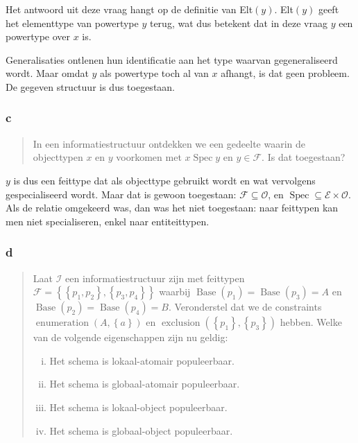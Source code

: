 \documentclass[10pt]{article}
\newcommand{\Spec}{\ensuremath{\operatorname{Spec}}}
\newcommand{\Base}{\ensuremath{\operatorname{Base}}}
\newcommand{\I}{\ensuremath{\mathcal{I}}}
\newcommand{\F}{\ensuremath{\mathcal{F}}}
\begin{document}
Het antwoord uit deze vraag hangt op de definitie van Elt$(y)$. Elt$(y)$ geeft
het elementtype van powertype $y$ terug, wat dus betekent dat in deze vraag $y$
een powertype over $x$ is. 

Generalisaties ontlenen hun identificatie aan het type waarvan gegeneraliseerd
wordt. Maar omdat $y$ als powertype toch al van $x$ afhangt, is dat geen
probleem. De gegeven structuur is dus toegestaan.

\subsubsection{c}

\begin{quote}
  In een informatiestructuur ontdekken we een gedeelte waarin de objecttypen
  $x$ en $y$ voorkomen met $x \Spec y$ en $y \in \mathcal{F}$. Is dat
  toegestaan? \cite{tentamen2011}
\end{quote}

$y$ is dus een feittype dat als objecttype gebruikt wordt en wat vervolgens
gespecialiseerd wordt. Maar dat is gewoon toegestaan: $\mathcal{F} \subseteq
\mathcal{O}$, en $\Spec \subseteq \mathcal{E} \times \mathcal{O}$. Als de relatie 
omgekeerd was, dan was het niet toegestaan: naar feittypen kan men niet 
specialiseren, enkel naar entiteittypen.

\subsubsection{d}
\label{ss2:1d}
\begin{quote}

  Laat $\I$ een informatiestructuur zijn met feittypen $\F = \left\{ \left\{ p_1,
  p_2 \right\}, \left\{ p_3, p_4 \right\} \right\}$ waarbij $\Base(p_1)
  = \Base(p_3) = A$ en $\Base(p_2) = \Base(p_4) = B$. Veronderstel dat we de
  constraints $\operatorname{enumeration}(A, \left\{ a \right\})$ en
  $\operatorname{exclusion}(\left\{ p_1 \right\}, \left\{ p_3 \right\})$
  hebben. Welke van de volgende eigenschappen zijn nu geldig: 
  \begin{enumerate}[i.]
    \item Het schema is lokaal-atomair populeerbaar.
    \item Het schema is globaal-atomair populeerbaar.
    \item Het schema is lokaal-object populeerbaar.
    \item Het schema is globaal-object populeerbaar.
  \end{enumerate} 
  \cite{tentamen2011}
\end{quote}
\end{document}
